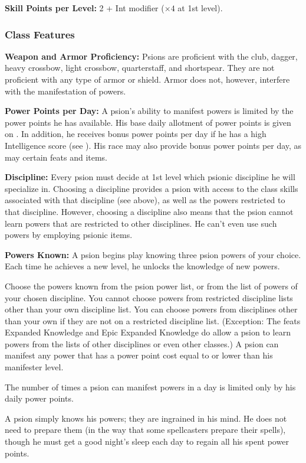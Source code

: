 \textbf{Skill Points per Level:} 2 + Int modifier ($\times 4$ at 1st level).

\subsubsection{Class Features}

\textbf{Weapon and Armor Proficiency:} Psions are proficient with the club, dagger, heavy crossbow, light crossbow, quarterstaff, and shortspear. They are not proficient with any type of armor or shield. Armor does not, however, interfere with the manifestation of powers.

\textbf{Power Points per Day:} A psion's ability to manifest powers is limited by the power points he has available. His base daily allotment of power points is given on . In addition, he receives bonus power points per day if he has a high Intelligence score (see ). His race may also provide bonus power points per  day, as may certain feats and items.

\textbf{Discipline:} Every psion must decide at 1st level which psionic discipline he will specialize in. Choosing a discipline provides a psion with access to the class skills associated with that discipline (see above), as well as the powers restricted to that discipline. However, choosing a discipline also means that the psion cannot learn powers that are restricted to other disciplines. He can't even use such powers by employing psionic items.

\textbf{Powers Known:} A psion begins play knowing three psion powers of your choice. Each time he achieves a new level, he unlocks the knowledge of new powers.

Choose the powers known from the psion power list, or from the list of powers of your chosen discipline. You cannot choose powers from restricted discipline lists other than your own discipline list. You can choose powers from disciplines other than your own if they are not on a restricted discipline list. (Exception: The feats Expanded Knowledge and Epic Expanded Knowledge do allow a psion to learn powers from the lists of other disciplines or even other classes.) A psion can manifest any power that has a power point cost equal to or lower than his manifester level.

The number of times a psion can manifest powers in a day is limited only by his daily power points.

A psion simply knows his powers; they are ingrained in his mind. He does not need to prepare them (in the way that some spellcasters prepare their spells), though he must get a good night's sleep each day to regain all his spent power points.

